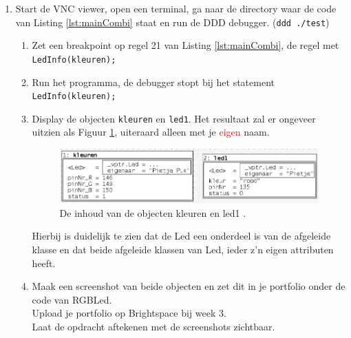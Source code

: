 \begin{enumerate}[label=(\alph*)]
\newpage
\item Start de VNC viewer, open een terminal, ga naar de directory waar de code van Listing \ref{lst:mainCombi} staat en run de DDD debugger. (\texttt{ddd ./test})
\begin{enumerate}[label=(\roman*)]
	\item Zet een breakpoint op regel 21 van Listing \ref{lst:mainCombi}, de regel met \texttt{LedInfo(kleuren);}
	\item Run het programma, de debugger stopt bij het statement \texttt{ LedInfo(kleuren);}
	\item Display de objecten \texttt{kleuren} en \texttt{led1}. Het resultaat zal er ongeveer uitzien als Figuur \ref{fig:DDDRGB}, uiteraard alleen met je \textcolor{red}{\huge{eigen}} naam. 
		\begin{figure}[h!]
		\captionsetup{justification=centering}
		\includegraphics[width=0.95 \textwidth]{figuren/DDDRGB}
		\centering
		\caption{De inhoud van de objecten kleuren en led1 .}
		\label{fig:DDDRGB}
	\end{figure}
Hierbij is duidelijk te zien dat de Led een onderdeel is van de afgeleide klasse en dat beide afgeleide klassen van Led, ieder z'n eigen attributen heeft. 
\item Maak een screenshot van beide objecten en zet dit in je portfolio onder de code van RGBLed.\\
Upload je portfolio op Brightspace bij week 3.\\
Laat de opdracht aftekenen met de screenshots zichtbaar.
	
\end{enumerate}
\end{enumerate}
